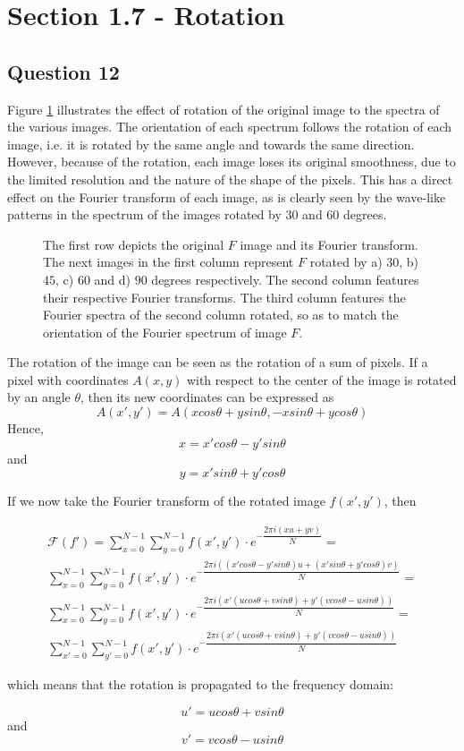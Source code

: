 \section{Section 1.7 - Rotation}

\subsection{Question 12}

Figure \ref{fig:Q12} illustrates the effect of rotation of the original image to the spectra of the various images. The orientation of each spectrum
follows the rotation of each image, i.e. it is rotated by the same angle and towards the same direction. However, because of the rotation, each
image loses its original smoothness, due to the limited resolution and the nature of the shape of the pixels. This has a direct effect on the Fourier transform
of each image, as is clearly seen by the wave-like patterns in the spectrum of the images rotated by $30$ and $60$ degrees.

\begin{figure}
	\centering
	
	\caption{The first row depicts the original $F$ image and its Fourier transform. The next images in the first column represent $F$ rotated by 
	a) $30$, b) $45$, c) $60$ and d) $90$ degrees respectively. 
	The second column features their respective Fourier transforms. The third column features the Fourier spectra of the second column
	rotated, so as to match the orientation of the Fourier spectrum of image $F$.}
	\label{fig:Q12}
\end{figure}

The rotation of the image can be seen as the rotation of a sum of pixels. If a pixel with coordinates $A(x,y)$ with respect
to the center of the image is rotated by an angle $\theta$, then its new coordinates can be expressed as 
$$A(x',y') = A(x cos\theta + ysin\theta, -x sin\theta + y cos\theta)$$
Hence, $$x = x' cos\theta - y' sin\theta$$ and $$y = x' sin\theta + y' cos\theta$$

If we now take the Fourier transform of the rotated image $f(x',y')$, then

\begin{multline}
\mathcal{F}(f') = \sum_{x=0}^{N-1} \sum_{y=0}^{N-1} f(x',y') \cdot e^{-\dfrac{2 \pi i (xu + yv)}{N}} = \\
\sum_{x=0}^{N-1} \sum_{y=0}^{N-1} f(x',y') \cdot e^{-\dfrac{2 \pi i ((x' cos\theta - y' sin\theta)u + (x' sin\theta + y' cos\theta)v)}{N}} = \\
\sum_{x=0}^{N-1} \sum_{y=0}^{N-1} f(x',y') \cdot e^{-\dfrac{2 \pi i (x' (u cos\theta + v sin\theta) + y' (v cos\theta -u sin\theta))}{N}} = \\
\sum_{x'=0}^{N-1} \sum_{y'=0}^{N-1} f(x',y') \cdot e^{-\dfrac{2 \pi i (x' (u cos\theta + v sin\theta) + y' (v cos\theta -u sin\theta))}{N}}
\end{multline}

which means that the rotation is propagated to the frequency domain:

$$u' = u cos\theta + v sin\theta$$ and $$v' = v cos\theta -u sin\theta$$